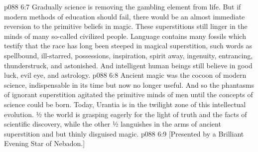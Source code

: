 \vs p088 6:7 Gradually science is removing the gambling element from life. But if modern methods of education should fail, there would be an almost immediate reversion to the primitive beliefs in magic. These superstitions still linger in the minds of many so\hyp{}called civilized people. Language contains many fossils which testify that the race has long been steeped in magical superstition, such words as spellbound, ill\hyp{}starred, possessions, inspiration, spirit away, ingenuity, entrancing, thunderstruck, and astonished. And intelligent human beings still believe in good luck, evil eye, and astrology.
\vs p088 6:8 Ancient magic was the cocoon of modern science, indispensable in its time but now no longer useful. And so the phantasms of ignorant superstition agitated the primitive minds of men until the concepts of science could be born. Today, Urantia is in the twilight zone of this intellectual evolution. ½ the world is grasping eagerly for the light of truth and the facts of scientific discovery, while the other ½ languishes in the arms of ancient superstition and but thinly disguised magic.
\vsetoff
\vs p088 6:9 [Presented by a Brilliant Evening Star of Nebadon.]
